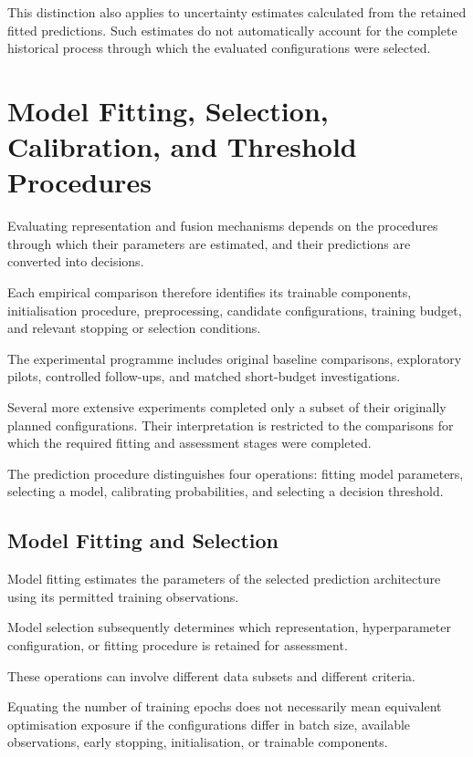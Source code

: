 This distinction also applies to uncertainty estimates calculated from the retained fitted predictions. Such estimates do not automatically account for the complete historical process through which the evaluated configurations were selected.

\section{Model Fitting, Selection, Calibration, and Threshold Procedures}
\label{sec:ch4-fitting}

Evaluating representation and fusion mechanisms depends on the procedures through which their parameters are estimated, and their predictions are converted into decisions.

Each empirical comparison therefore identifies its trainable components, initialisation procedure, preprocessing, candidate configurations, training budget, and relevant stopping or selection conditions.

The experimental programme includes original baseline comparisons, exploratory pilots, controlled follow-ups, and matched short-budget investigations.

Several more extensive experiments completed only a subset of their originally planned configurations. Their interpretation is restricted to the comparisons for which the required fitting and assessment stages were completed.

The prediction procedure distinguishes four operations: fitting model parameters, selecting a model, calibrating probabilities, and selecting a decision threshold.

\subsection{Model Fitting and Selection}

Model fitting estimates the parameters of the selected prediction architecture using its permitted training observations.

Model selection subsequently determines which representation, hyperparameter configuration, or fitting procedure is retained for assessment.

These operations can involve different data subsets and different criteria.

Equating the number of training epochs does not necessarily mean equivalent optimisation exposure if the configurations differ in batch size, available observations, early stopping, initialisation, or trainable components.

